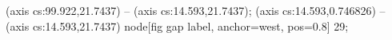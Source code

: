  (axis cs:99.922,21.7437) -- (axis cs:14.593,21.7437);
 (axis cs:14.593,0.746826) -- (axis cs:14.593,21.7437)
  node[fig gap label, anchor=west, pos=0.8] {\texttimes{}29};
